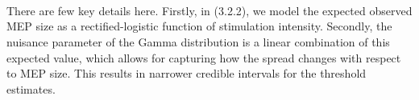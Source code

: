 \documentclass[a4paper,12pt]{article}
\begin{document}
\\\\\\There are few key details here. Firstly, in (3.2.2), we model the expected observed MEP size as a rectified-logistic function of stimulation intensity. Secondly, the nuisance parameter of the Gamma distribution is a linear combination of this expected value, which allows for capturing how the spread changes with respect to MEP size. This results in narrower credible intervals for the threshold estimates.
\end{document}
